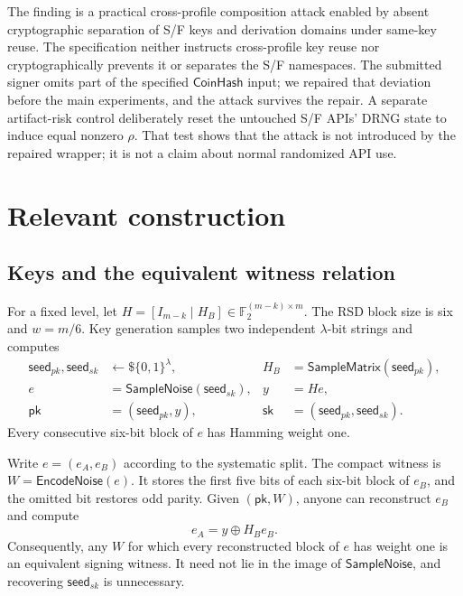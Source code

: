 \documentclass[11pt,a4paper]{article}
\newcommand{\F}{\mathbb F}
\newcommand{\bits}{\{0,1\}}
\newcommand{\xor}{\mathbin{\oplus}}
\newcommand{\pk}{\ensuremath{\mathsf{pk}}}
\newcommand{\sk}{\ensuremath{\mathsf{sk}}}
\newcommand{\CoinHash}{\ensuremath{\mathsf{CoinHash}}}
\newcommand{\EncodeNoise}{\ensuremath{\mathsf{EncodeNoise}}}
\newcommand{\sample}{\mathrel{\leftarrow\$}}
\begin{document}
The finding is a practical cross-profile composition attack enabled by absent
cryptographic separation of S/F keys and derivation domains under same-key
reuse.  The
specification neither instructs cross-profile key reuse nor cryptographically
prevents it or separates the S/F namespaces.  The submitted signer omits part
of the specified \CoinHash{} input; we repaired that deviation before the main
experiments, and the attack survives the repair.  A separate artifact-risk
control deliberately reset the untouched S/F APIs' DRNG state to induce equal
nonzero $\rho$.  That test shows that the attack is not introduced by the
repaired wrapper; it is not a claim about normal randomized API use.

\section{Relevant construction}

\subsection{Keys and the equivalent witness relation}

For a fixed level, let $H=[I_{m-k}\mid H_B]\in\F_2^{(m-k)\times m}$.
The RSD block size is six and $w=m/6$.  Key generation samples two independent
$\lambda$-bit strings and computes
\begin{align}
 \mathsf{seed}_{pk},\mathsf{seed}_{sk}&\sample\bits^\lambda,
 &H_B&=\mathsf{SampleMatrix}(\mathsf{seed}_{pk}),\nonumber\\
 e&=\mathsf{SampleNoise}(\mathsf{seed}_{sk}),
 &y&=He,                                                     \label{eq:keygen}\\
 \pk&=(\mathsf{seed}_{pk},y),
 &\sk&=(\mathsf{seed}_{pk},\mathsf{seed}_{sk}).\nonumber
\end{align}
Every consecutive six-bit block of $e$ has Hamming weight one.

Write $e=(e_A,e_B)$ according to the systematic split.  The compact witness is
$W=\EncodeNoise(e)$.  It stores the first five bits of each six-bit block of
$e_B$, and the omitted bit restores odd parity.  Given $(\pk,W)$, anyone can
reconstruct $e_B$ and compute
\begin{equation}
                  e_A=y\xor H_Be_B.                         \label{eq:decode}
\end{equation}
Consequently, any $W$ for which every reconstructed block of $e$ has weight one
is an equivalent signing witness.  It need not lie in the image of
$\mathsf{SampleNoise}$, and recovering $\mathsf{seed}_{sk}$ is unnecessary.
\end{document}
